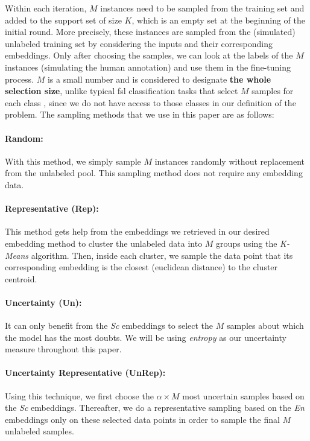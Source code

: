 \documentclass[11pt]{article}
\theoremstyle{definition}
\begin{document}
Within each iteration, $M$ instances need to be sampled from the training set and added to the support set of size $K$, which is an empty set at the beginning of the initial round. More precisely, these instances are sampled from the (simulated) unlabeled training set by considering the inputs and their corresponding embeddings.
Only after choosing the samples, we can look at the labels of the $M$ instances (simulating the human annotation) and use them in the fine-tuning process.
$M$ is a small number
and is considered to designate \textbf{the whole selection size}, unlike typical \gls*{fsl} classification tasks that select $M$ samples for each class \cite{ren2018meta, chen2019closer, wang2023few}, since we do not have access to those classes in our definition of the problem.
The sampling methods that we use in this paper are as follows:

\paragraph{Random:}
With this method, we simply sample $M$ instances randomly without replacement from the unlabeled pool. This sampling method does not require any embedding data.

\paragraph{Representative (Rep):}
This method gets help from the embeddings we retrieved in our desired embedding method to cluster the unlabeled data into $M$ groups using the \textit{K-Means} algorithm. Then, inside each cluster, we sample the data point that its corresponding embedding is the closest (euclidean distance) to the cluster centroid. 

\paragraph{Uncertainty (Un):}
It can only benefit from the \textit{Sc} embeddings to select the $M$ samples about which the model has the most doubts. We will be using \textit{entropy} \cite{shannon1948mathematical, settles2009active} as our uncertainty measure throughout this paper.

\paragraph{Uncertainty Representative (UnRep):}
Using this technique, we first choose the $\alpha \times M$ most uncertain samples based on the \textit{Sc} embeddings. Thereafter, we do a representative sampling based on the \textit{En} embeddings only on these selected data points in order to sample the final $M$ unlabeled samples.
\end{document}
